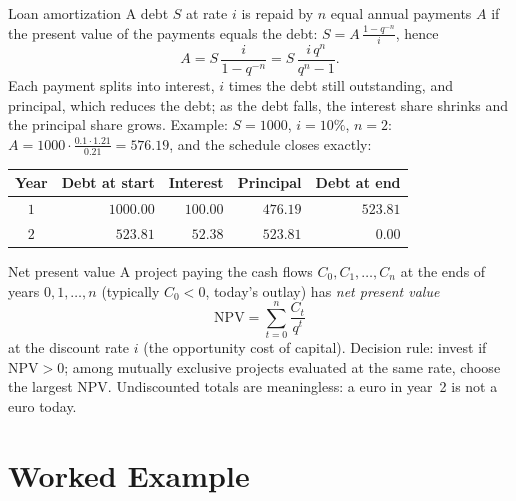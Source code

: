 \begin{rulebox}{Loan amortization}
A debt $S$ at rate $i$ is repaid by $n$ equal annual payments $A$ if the present value of the payments equals
the debt: $S=A\,\frac{1-q^{-n}}{i}$, hence
\[
  A=S\,\frac{i}{1-q^{-n}}=S\,\frac{i\,q^{n}}{q^{n}-1} .
\]
Each payment splits into interest, $i$ times the debt still outstanding,
and principal, which reduces the debt; as the debt falls,
the interest share shrinks and the principal share grows.
Example: $S=1000$, $i=10\%$, $n=2$:
$A=1000\cdot\frac{0.1\cdot 1.21}{0.21}=576.19$, and the schedule closes
exactly:

\begin{center}
\begin{tabular}{c r r r r}
\hline
Year & Debt at start & Interest & Principal & Debt at end\\
\hline
$1$ & $1000.00$ & $100.00$ & $476.19$ & $523.81$\\
$2$ & $523.81$ & $52.38$ & $523.81$ & $0.00$\\
\hline
\end{tabular}
\end{center}
\end{rulebox}

\begin{rulebox}{Net present value}
A project paying the cash flows $C_{0},C_{1},\dots,C_{n}$ at the ends of
years $0,1,\dots,n$ (typically $C_{0}<0$, today's outlay) has
\emph{net present value}
\[
  \mathrm{NPV}=\sum_{t=0}^{n}\frac{C_{t}}{q^{t}}
\]
at the discount rate $i$ (the opportunity cost of capital). Decision
rule: invest if $\mathrm{NPV}>0$; among mutually exclusive projects
evaluated at the same rate, choose the largest NPV. Undiscounted totals
are meaningless: a euro in year~2 is not a euro today.
\end{rulebox}

\section{Worked Example}

